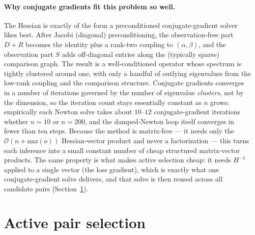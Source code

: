\documentclass[12pt]{article}
\begin{document}
\paragraph{Why conjugate gradients fit this problem so well.}
The Hessian is exactly of the form a preconditioned conjugate-gradient solver likes best. After
Jacobi (diagonal) preconditioning, the observation-free part $D + R$ becomes the identity plus a
rank-two coupling to $(\alpha, \beta)$, and the observation part $S$ adds off-diagonal entries
along the (typically sparse) comparison graph. The result is a well-conditioned operator whose
spectrum is tightly clustered around one, with only a handful of outlying eigenvalues from the
low-rank coupling and the comparison structure. Conjugate gradients converges in a number of
iterations governed by the number of eigenvalue \emph{clusters}, not by the dimension, so the
iteration count stays essentially constant as $n$ grows: empirically each Newton solve takes about
$10$--$12$ conjugate-gradient iterations whether $n = 10$ or $n = 200$, and the damped-Newton
loop itself converges in fewer than ten steps. Because the method is matrix-free --- it needs only
the $\mathcal{O}(n + \mathrm{nnz}(o))$ Hessian-vector product and never a factorization --- this
turns each inference into a small constant number of cheap structured matrix-vector products. The
same property is what makes active selection cheap: it needs $H^{-1}$ applied to a single vector
(the loss gradient), which is exactly what one conjugate-gradient solve delivers, and that solve is
then reused across all candidate pairs (Section~\ref{sec:active}).

\section{Active pair selection}
\label{sec:active}
\end{document}
